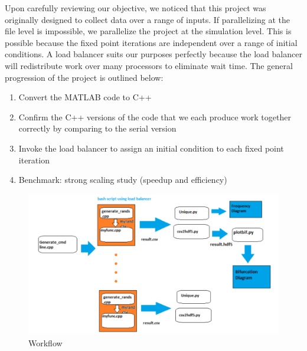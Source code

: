 \documentclass[12pt]{article}
\newcommand{\be}{\begin{enumerate}}
\newcommand{\ee}{\end{enumerate}}
\begin{document}
Upon carefully reviewing our objective, we noticed that this project
was originally designed to collect data over a range of inputs. If
parallelizing at the file level is impossible, we parallelize
the project at the simulation level. This is possible because the
fixed point iterations are independent over a range of initial
conditions. A load balancer suits our purposes perfectly because the
load balancer will redistribute work over many processors to eliminate
wait time. The general progression of the project is outlined below:
\be
\item Convert the MATLAB code to C++
\item Confirm the C++ versions of the code that we each produce work
  together correctly by comparing to the serial version
\item Invoke the load balancer to assign an initial condition to each
  fixed point iteration 
\item Benchmark: strong scaling study (speedup and efficiency)
\ee

\begin{figure}[H]
	\begin{center}
		\includegraphics[scale=0.5]{workflow}
\caption{Workflow}\label{workflow}
	\end{center}
\end{figure}
\end{document}

